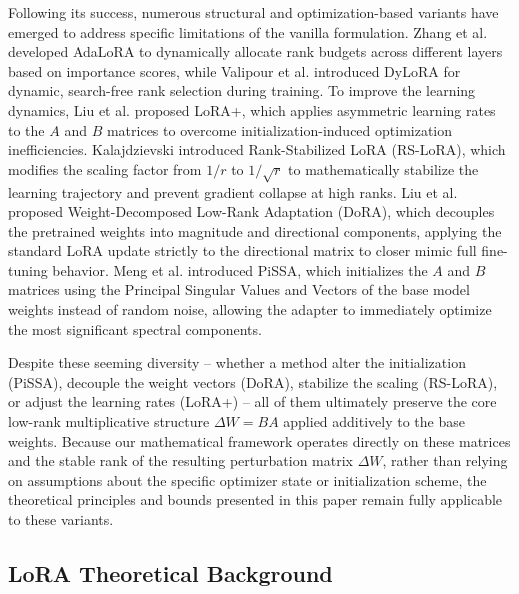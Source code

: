 \documentclass[a4paper,14pt]{extarticle}
\begin{document}
    Following its success, numerous structural and optimization-based variants have emerged to address specific limitations of the vanilla formulation. Zhang et al. \cite{zhang2023adaptive} developed AdaLoRA to dynamically allocate rank budgets across different layers based on importance scores, while Valipour et al. \cite{valipour2023dylora} introduced DyLoRA for dynamic, search-free rank selection during training. To improve the learning dynamics, Liu et al. \cite{liu2024lora} proposed LoRA+, which applies asymmetric learning rates to the $A$ and $B$ matrices to overcome initialization-induced optimization inefficiencies. Kalajdzievski \cite{kalajdzievski2023rankstabilizationscalingfactor} introduced Rank-Stabilized LoRA (RS-LoRA), which modifies the scaling factor from $1/r$ to $1/\sqrt{r}$ to mathematically stabilize the learning trajectory and prevent gradient collapse at high ranks. Liu et al. \cite{liu2024doraweightdecomposedlowrankadaptation} proposed Weight-Decomposed Low-Rank Adaptation (DoRA), which decouples the pretrained weights into magnitude and directional components, applying the standard LoRA update strictly to the directional matrix to closer mimic full fine-tuning behavior. Meng et al. \cite{meng2025pissaprincipalsingularvalues} introduced PiSSA, which initializes the $A$ and $B$ matrices using the Principal Singular Values and Vectors of the base model weights instead of random noise, allowing the adapter to immediately optimize the most significant spectral components. 

    Despite these seeming diversity -- whether a method alter the initialization (PiSSA), decouple the weight vectors (DoRA), stabilize the scaling (RS-LoRA), or adjust the learning rates (LoRA+) -- all of them ultimately preserve the core low-rank multiplicative structure $\Delta W = BA$ applied additively to the base weights. Because our mathematical framework operates directly on these matrices and the stable rank of the resulting perturbation matrix $\Delta W$, rather than relying on assumptions about the specific optimizer state or initialization scheme, the theoretical principles and bounds presented in this paper remain fully applicable to these variants.



    \subsection{LoRA Theoretical Background}
    
\end{document}
